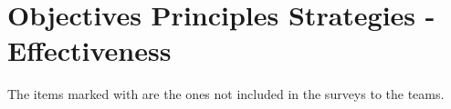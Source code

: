\chapter{Objectives Principles Strategies - Effectiveness}

The items marked with \XSolidBrush  are the ones not included in the surveys to the teams.

\newcommand*\addition{\item[\FiveStar]}
\newcommand*\indicatorAddition{\item[\FiveStarOutline]}
\newcommand*\strategyAddition{\item[\TwelweStar]}
\newcommand*\removed{\item[\XSolidBrush]}

